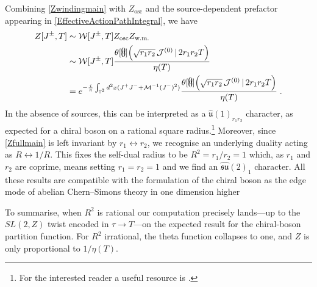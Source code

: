\documentclass[11pt]{article}
\numberwithin{equation}{section}
\begin{document}
Combining \eqref{Zwindingmain} with $Z_{\text{osc}}$ and the source-dependent prefactor appearing in \eqref{EffectiveActionPathIntegral}, we have
\begin{align}
Z[J^\pm, T] 
&\sim \mathcal{W}[J^\pm,T] Z_{\text{osc}}Z_{\text{w.m.}}\nonumber\\
&\sim\mathcal{W}[J^\pm,T]   \frac{\theta \! \begin{bmatrix} \vspace{-20pt} \\ 0  \\ \vspace{-20pt} \\ 0 \\ \vspace{-20pt} \end{bmatrix} \! \Big( \sqrt{r_1 r_2} \, \mathcal{J}^{(0)} \, | \,  2r_{1} r_{2}  T \Big)}{\eta(T)} \nonumber\\
&= e^{-\frac{i}{\pi} \int_{\mathbb T^2} d^2x (J^+J^-+{\mathcal M}^{-1}(J^-)^2)} \frac{\theta \! \begin{bmatrix} \vspace{-20pt} \\ 0  \\ \vspace{-20pt} \\ 0 \\ \vspace{-20pt} \end{bmatrix} \! \Big( \sqrt{r_1 r_2} \, \mathcal{J}^{(0)} \, | \,  2r_{1} r_{2}  T \Big)}{\eta(T)}\;.
\label{Zfullmain}
\end{align}
In the absence of sources, this can be interpreted as a $\widehat{\mathfrak{u}}(1)_{r_1 r_2}$ character, as expected for a chiral boson on a rational square radius.\footnote{For the interested reader a useful resource is \cite{DiFrancesco:1997nk}.} Moreover, since \eqref{Zfullmain} is left invariant by $r_1 \leftrightarrow r_2$, we recognise an underlying duality acting  as $R \leftrightarrow 1/R$. This fixes the self-dual radius to be $R^2=r_1/r_2=1$ which, as $r_1$ and $r_2$ are coprime, means setting $r_1 = r_2 = 1$ and we find an $\widehat{\mathfrak{su}}(2)_1$ character. All these results are compatible with the formulation of the chiral boson as the edge mode of abelian Chern--Simons theory in one dimension higher \cite{Moore:1988qv,Moore:1989yh,Elitzur:1989nr}

To summarise, when $R^2$ is rational our computation precisely lands---up to the $SL(2,Z)$ twist encoded in $\tau\to T$---on the expected result for the chiral-boson partition function. For $R^2$ irrational, the theta function collapses to one, and $Z$ is only proportional to $1/\eta(T)$.
\end{document}
